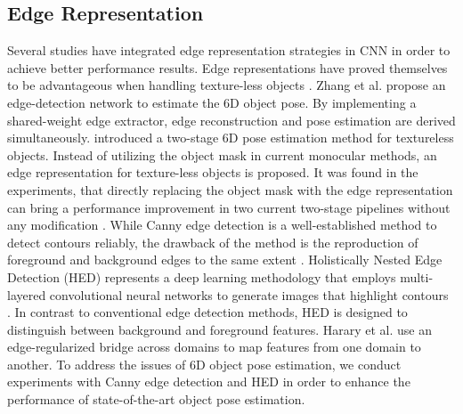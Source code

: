 \subsection{Edge Representation}
Several studies have integrated edge representation strategies in CNN in order to achieve better performance results. 
Edge representations have proved themselves to be advantageous when handling texture-less objects \cite{er-pose, d2co}.
Zhang et al. \cite{zhang2022eanet} propose an edge-detection network to estimate the 6D object pose. By implementing a shared-weight edge extractor, edge reconstruction and pose estimation are derived simultaneously.
\cite{er-pose} introduced a two-stage 6D pose estimation method for textureless objects.
Instead of utilizing the object mask in current monocular methods, an edge representation for texture-less objects is proposed.
It was found in the experiments, that directly replacing the object mask with the edge representation can bring a performance improvement in two current two-stage pipelines without any modification \cite{er-pose}.
While Canny edge detection is a well-established method to detect contours reliably, the drawback of the method is the reproduction of foreground and background edges to the same extent \cite{canny}.
Holistically Nested Edge Detection (HED) represents a deep learning methodology that employs multi-layered convolutional neural networks to generate images that highlight contours \cite{xie15hed}.
In contrast to conventional edge detection methods, HED is designed to distinguish between background and foreground features. 
Harary et al. \cite{harary2022brad} use an edge-regularized bridge across domains to map features from one domain to another. 
To address the issues of 6D object pose estimation, we conduct experiments with Canny edge detection and HED in order to enhance the performance of state-of-the-art object pose estimation.